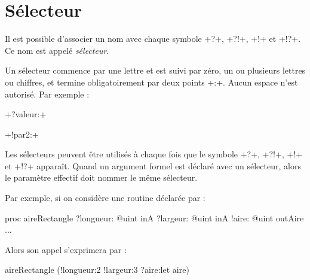 








\section{Sélecteur}

Il est possible d'associer un nom avec chaque symbole \ggst+?+, \ggst+?!+, \ggst+!+ et \ggst+!?+. Ce nom est appelé \emph{sélecteur}.

Un sélecteur commence par une lettre et est suivi par zéro, un ou plusieurs lettres ou chiffres, et termine obligatoirement par deux points \ggst+:+. Aucun espace n'est autorisé. Par exemple :

\ggst+?valeur:+

\ggst+!par2:+

Les sélecteurs peuvent être utilisés à chaque fois que le symbole \ggst+?+, \ggst+?!+, \ggst+!+ et \ggst+!?+ apparaît. Quand un argument formel est déclaré avec un sélecteur, alors le paramètre effectif doit nommer le même sélecteur.

Par exemple, si on considère une routine déclarée par :

\begin{galgas3}
proc aireRectangle
  ?longueur: @uint inA
  ?largeur: @uint inA
  !aire: @uint outAire
{
  ...
}
\end{galgas3}

Alors son appel s'exprimera par :
\begin{galgas3}
  aireRectangle (!longueur:2 !largeur:3 ?aire:let aire)
\end{galgas3}


